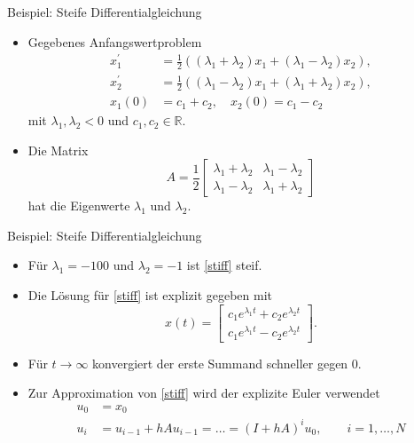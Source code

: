 \begin{frame}{Beispiel: Steife Differentialgleichung}
    \begin{itemize}
        \item<1-> Gegebenes Anfangswertproblem
        \begin{align}
            \label{stiff}
            x_{1}^{\prime} &= \frac{1}{2} ((\lambda_1 + \lambda_2)x_1 + (\lambda_1 - \lambda_2)x_2), \nonumber \\
            x_{2}^{\prime} &= \frac{1}{2} ((\lambda_1 - \lambda_2)x_1 + (\lambda_1 + \lambda_2)x_2), \\
            x_1(0) &= c_1 + c_2, \quad x_2(0) = c_1 - c_2 \nonumber
        \end{align}
        mit $\lambda_1, \lambda_2 < 0$ und $c_1,c_2 \in \mathbb{R}$.
        \item<2-> Die Matrix
        \[
            A = \frac{1}{2}
            \begin{bmatrix}
                \lambda_1 + \lambda_2 & \lambda_1 - \lambda_2 \\
                \lambda_1 - \lambda_2 & \lambda_1 + \lambda_2
            \end{bmatrix}
        \]
        hat die Eigenwerte $\lambda_1$ und $\lambda_2$.
    \end{itemize}
\end{frame}

\begin{frame}{Beispiel: Steife Differentialgleichung}
    \begin{itemize}
        \item<1-> Für $\lambda_1=-100$ und $\lambda_2=-1$ ist \eqref{stiff} steif.
        \item<2-> Die Lösung für \eqref{stiff} ist explizit gegeben mit
        \[
            x(t) =
            \begin{bmatrix}
                c_1 e^{\lambda_1 t} + c_2 e^{\lambda_2 t} \\
                c_1 e^{\lambda_1 t} - c_2 e^{\lambda_2 t}
            \end{bmatrix}.
        \]
        \item<3-> Für $t \rightarrow \infty$ konvergiert der erste Summand schneller gegen $0$.
        \item<4-> Zur Approximation von \eqref{stiff} wird der explizite Euler verwendet
        \begin{align*}
            u_0 &= x_0 \\
            u_i &= u_{i-1} + hAu_{i-1}= \dots = (I + hA)^{i}u_0, \qquad i=1,\dots,N
        \end{align*}
    \end{itemize}
\end{frame}

